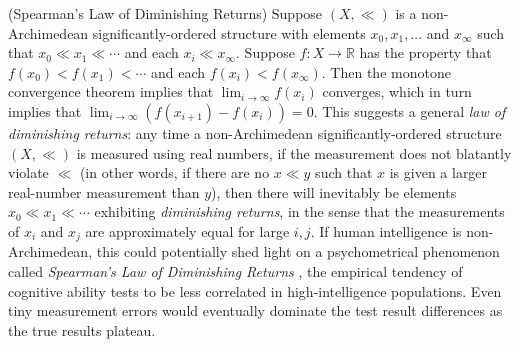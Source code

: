 \documentclass[twoside,11pt]{article}
\begin{document}
\begin{remark}
(Spearman's Law of Diminishing Returns)
Suppose $(X,\ll)$ is a non-Archimedean significantly-ordered structure
with elements $x_0,x_1,\ldots$ and $x_\infty$ such that
$x_0\ll x_1\ll\cdots$ and each $x_i\ll x_\infty$.
Suppose $f:X\to\mathbb R$ has the property that $f(x_0)<f(x_1)<\cdots$
and each $f(x_i)<f(x_\infty)$. Then the monotone convergence theorem implies
that $\lim_{i\to\infty}f(x_i)$ converges, which in turn implies that
$\lim_{i\to\infty}(f(x_{i+1})-f(x_i))=0$. This suggests a general \emph{law
of diminishing returns}: any time a non-Archimedean significantly-ordered
structure $(X,\ll)$ is measured using
real numbers, if the measurement does not blatantly violate $\ll$ (in other
words, if there are no $x\ll y$ such that $x$ is given a larger real-number
measurement than $y$), then there will inevitably be elements $x_0\ll x_1\ll \cdots$
exhibiting \emph{diminishing returns}, in the sense that the measurements of
$x_i$ and $x_j$ are approximately equal for large $i,j$.
If human intelligence is non-Archimedean, this could potentially shed light on
a psychometrical phenomenon called \emph{Spearman's Law of Diminishing Returns}
\citep{spearman1927abilities, blum2017spearman, hernandez2019ai}, the empirical
tendency of cognitive ability tests to be less correlated in
high-intelligence populations. Even tiny measurement errors would eventually
dominate the test result differences as the true results plateau.
\end{remark}
\end{document}

